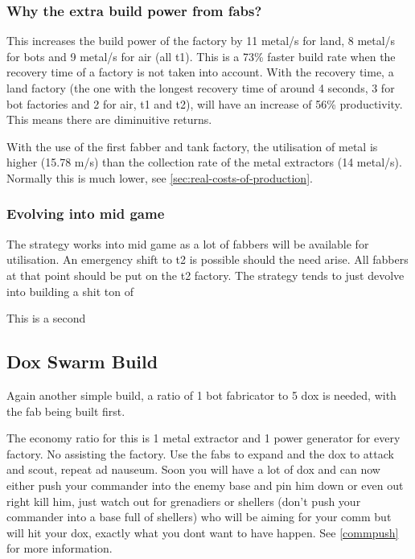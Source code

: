 \documentclass[]{article}
\begin{document}
\subsubsection{Why the extra build power from fabs?}
This increases the build power of the factory by 11 metal/s for land, 8 metal/s for bots and 9 metal/s for air (all t1).  This is a 73\% faster build rate when the recovery time of a factory is not taken into account.  With the recovery time, a land factory (the one with the longest recovery time of around 4 seconds, 3 for bot factories and 2 for air, t1 and t2), will have an increase of 56\% productivity.  This means there are diminuitive returns.  

With the use of the first fabber and tank factory, the utilisation of metal is higher (15.78 m/s) than the collection rate of the metal extractors (14 metal/s).  Normally this is much lower, see \ref{sec:real-costs-of-production}.   
\subsubsection{Evolving into mid game}

The strategy works into mid game as a lot of fabbers will be available for utilisation.  An emergency shift to t2 is possible should the need arise.  All fabbers at that point should be put on the t2 factory.  The strategy tends to just devolve into building a shit ton of 






This is a second 



\subsection{Dox Swarm Build}

Again another simple build, a ratio of 1 bot fabricator to 5 dox is needed, with the fab being built first. 




The economy ratio for this is 1 metal extractor and 1 power generator for every factory.  No assisting the factory.  Use the fabs to expand and the dox to attack and scout, repeat ad nauseum.  Soon you will have a lot of dox and can now either push your commander into the enemy base and pin him down or even out right kill him, just watch out for grenadiers or shellers (don't push your commander into a base full of shellers) who will be aiming for your comm but will hit your dox, exactly what you dont want to have happen.  See \ref{commpush} for more information.  
\end{document}
